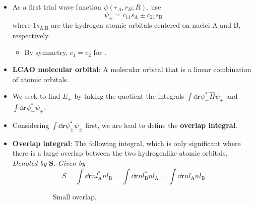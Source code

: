 \documentclass[../notes.tex]{subfiles}
\begin{document}
\begin{itemize}
\begin{itemize}
    \end{itemize}
    \item As a first trial wave function $\psi(r_A,r_B;R)$, use
    \begin{equation*}
        \psi_\pm = c_11s_\text{A}\pm c_21s_\text{B}
    \end{equation*}
    where $1s_\text{A,B}$ are the hydrogen atomic orbitals centered on nuclei A and B, respectively.
    \begin{itemize}
        \item By symmetry, $c_1=c_2$ for .
    \end{itemize}
    \item \textbf{LCAO molecular orbital}: A molecular orbital that is a linear combination of atomic orbitals.
    \item We seek to find $E_\pm$ by taking the quotient the integrals $\int\dd{\mathbf{r}}\psi_\pm^*\hat{H}\psi_\pm$ and $\int\dd{\mathbf{r}}\psi_\pm^*\psi_\pm$.
    \item Considering $\int\dd{\mathbf{r}}\psi_\pm^*\psi_\pm$ first, we are lead to define the \textbf{overlap integral}.
    \item \textbf{Overlap integral}: The following integral, which is only significant where there is a large overlap between the two hydrogenlike atomic orbitals. \emph{Denoted by} $\bm{S}$. \emph{Given by}
    \begin{equation*}
        S = \int\dd{\mathbf{r}}nl_\text{A}^*nl_\text{B}
        = \int\dd{\mathbf{r}}nl_\text{B}^*nl_\text{A}
        = \int\dd{\mathbf{r}}nl_\text{A}nl_\text{B}
    \end{equation*}
    \begin{figure}[h!]
        \centering
        \begin{subfigure}[b]{0.4\linewidth}
            \centering
            \caption{Small overlap.}
            \label{fig:overlapIntegrala}
        \end{subfigure}
        \begin{subfigure}[b]{0.4\linewidth}
            \centering
\end{subfigure}
\end{figure}
\end{itemize}
\end{document}
